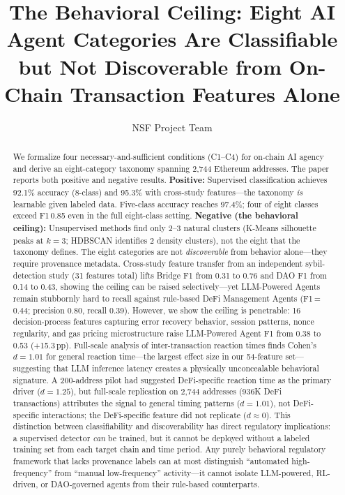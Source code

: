 \documentclass[sigconf,nonacm=false]{acmart}
\begin{document}
\title{The Behavioral Ceiling: Eight AI Agent Categories Are Classifiable but Not Discoverable from On-Chain Transaction Features Alone}
\author{NSF Project Team}

\begin{abstract}
We formalize four necessary-and-sufficient conditions (C1--C4) for on-chain AI agency and derive an eight-category taxonomy spanning 2,744 Ethereum addresses.
The paper reports both positive and negative results.
\textbf{Positive:} Supervised classification achieves 92.1\% accuracy (8-class) and 95.3\% with cross-study features---the taxonomy \emph{is} learnable given labeled data.
Five-class accuracy reaches 97.4\%; four of eight classes exceed F1\,0.85 even in the full eight-class setting.
\textbf{Negative (the behavioral ceiling):} Unsupervised methods find only 2--3 natural clusters (K-Means silhouette peaks at $k{=}3$; HDBSCAN identifies 2 density clusters), not the eight that the taxonomy defines.
The eight categories are not \emph{discoverable} from behavior alone---they require provenance metadata.
Cross-study feature transfer from an independent sybil-detection study (31 features total) lifts Bridge F1 from 0.31 to 0.76 and DAO F1 from 0.14 to 0.43, showing the ceiling can be raised selectively---yet LLM-Powered Agents remain stubbornly hard to recall against rule-based DeFi Management Agents (F1\,=\,0.44; precision 0.80, recall 0.39).
However, we show the ceiling is penetrable: 16 decision-process features capturing error recovery behavior, session patterns, nonce regularity, and gas pricing microstructure raise LLM-Powered Agent F1 from 0.38 to 0.53 (+15.3\,pp).
Full-scale analysis of inter-transaction reaction times finds Cohen's $d{=}1.01$ for general reaction time---the largest effect size in our 54-feature set---suggesting that LLM inference latency creates a physically unconcealable behavioral signature.
A 200-address pilot had suggested DeFi-specific reaction time as the primary driver ($d{=}1.25$), but full-scale replication on 2,744 addresses (936K DeFi transactions) attributes the signal to general timing patterns ($d{=}1.01$), not DeFi-specific interactions; the DeFi-specific feature did not replicate ($d{\approx}0$).
This distinction between classifiability and discoverability has direct regulatory implications: a supervised detector \emph{can} be trained, but it cannot be deployed without a labeled training set from each target chain and time period.
Any purely behavioral regulatory framework that lacks provenance labels can at most distinguish ``automated high-frequency'' from ``manual low-frequency'' activity---it cannot isolate LLM-powered, RL-driven, or DAO-governed agents from their rule-based counterparts.
\end{abstract}
\end{document}
